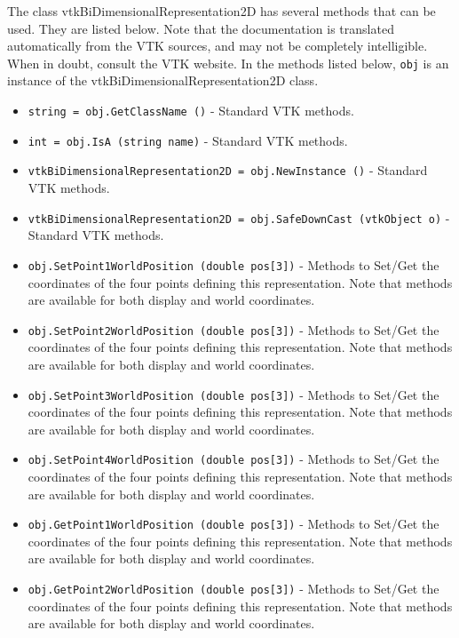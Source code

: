 The class vtkBiDimensionalRepresentation2D has several methods that can be used.
  They are listed below.
Note that the documentation is translated automatically from the VTK sources,
and may not be completely intelligible.  When in doubt, consult the VTK website.
In the methods listed below, \verb|obj| is an instance of the vtkBiDimensionalRepresentation2D class.
\begin{itemize}
\item  \verb|string = obj.GetClassName ()| -  Standard VTK methods.

\item  \verb|int = obj.IsA (string name)| -  Standard VTK methods.

\item  \verb|vtkBiDimensionalRepresentation2D = obj.NewInstance ()| -  Standard VTK methods.

\item  \verb|vtkBiDimensionalRepresentation2D = obj.SafeDownCast (vtkObject o)| -  Standard VTK methods.

\item  \verb|obj.SetPoint1WorldPosition (double pos[3])| -  Methods to Set/Get the coordinates of the four points defining
 this representation. Note that methods are available for both
 display and world coordinates.

\item  \verb|obj.SetPoint2WorldPosition (double pos[3])| -  Methods to Set/Get the coordinates of the four points defining
 this representation. Note that methods are available for both
 display and world coordinates.

\item  \verb|obj.SetPoint3WorldPosition (double pos[3])| -  Methods to Set/Get the coordinates of the four points defining
 this representation. Note that methods are available for both
 display and world coordinates.

\item  \verb|obj.SetPoint4WorldPosition (double pos[3])| -  Methods to Set/Get the coordinates of the four points defining
 this representation. Note that methods are available for both
 display and world coordinates.

\item  \verb|obj.GetPoint1WorldPosition (double pos[3])| -  Methods to Set/Get the coordinates of the four points defining
 this representation. Note that methods are available for both
 display and world coordinates.

\item  \verb|obj.GetPoint2WorldPosition (double pos[3])| -  Methods to Set/Get the coordinates of the four points defining
 this representation. Note that methods are available for both
 display and world coordinates.


\end{itemize}
